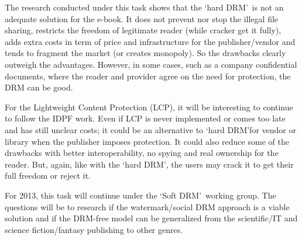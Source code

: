 \documentclass[11pt,a4paper,oneside]{memoir}
\begin{document}
The research conducted under this task shows that the \textquoteleft hard DRM\textquoteright ~is not an adequate solution for the e-book. It does not prevent nor stop the illegal file sharing, restricts the freedom of legitimate reader (while cracker get it fully), adds extra costs in term of price and infrastructure for the publisher/vendor and tends to fragment the market (or creates monopoly). So the drawbacks clearly outweigh the advantages. However, in some cases, such as a company confidential documents, where the reader and provider agree on the need for protection, the DRM can be good.

For the Lightweight Content Protection (LCP), it will be interesting to continue to follow the IDPF work. Even if LCP is never implemented or comes too late and has still unclear costs; it could be an alternative to \textquoteleft hard DRM\textquoteright for vendor or library when the publisher imposes protection. It could also reduce some of the drawbacks with better interoperability, no spying and real ownership for the reader. But, again, like with the \textquoteleft hard DRM\textquoteright , the users may crack it to get their full freedom or reject it.

For 2013, this task will continue under the \textquoteleft Soft DRM\textquoteright ~working group. The questions will be to research if the watermark/social DRM approach is a viable solution and if the DRM-free model can be generalized from the scientific/IT and science fiction/fantasy publishing to other genres.


\singlespacing
\begin{flushleft}

\end{flushleft}


\end{document}
